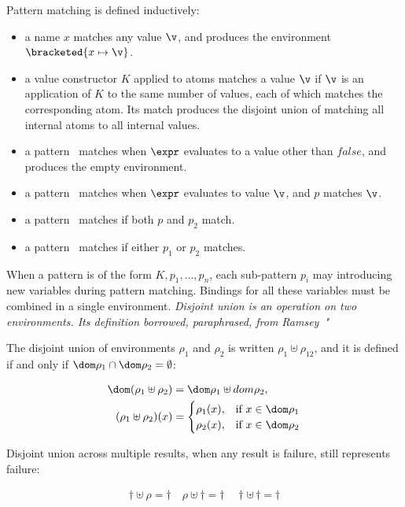 \documentclass[manuscript,screen,review, 12pt, nonacm]{acmart}
\begin{document}
Pattern matching is defined inductively: 
\begin{itemize}
    \item a name $x$ matches any value $\v$, and produces the environment 
    $\bracketed{x \mapsto \v}$. 
    \item a value constructor $K$ applied to atoms  matches 
    a value $\v$ if $\v$ is an application of $K$ to the same number of values,
    each of which matches the corresponding atom. Its match produces 
    the disjoint union of matching all internal atoms to all internal values. 
    \item a pattern \whenexpr\ matches when $\expr$ evaluates to a value other than 
    $\mathit{false}$, and produces the empty environment. 
    \item a pattern \parrowe\ matches when $\expr$ evaluates to 
          value $\v$, and $p$ matches $\v$. 
    \item a pattern \pcommap\ matches if both $p$ and $p_{2}$ match.
    \item a pattern \porp\ matches if either $p_{1}$ or $p_{2}$
    matches. 
\end{itemize}

When a pattern is of the form $K, p_{1}, \dots, p_{n}$, each sub-pattern $p_{i}$
may introducing new variables during pattern matching. Bindings for all these
variables must be combined in a single environment. \it{Disjoint union} is an
operation on two environments. Its definition borrowed, paraphrased, from Ramsey~\cite{bpc}" 

The disjoint union of environments $\rho_{1}$ and $\rho_{2}$ is written
$\rho_{1} \uplus \rho_{12}$, and it is defined if and only if $\dom \rho_{1}
\cap \dom \rho_{2} = \emptyset$:

\begin{align*}
  \dom(\rho_{1} \uplus \rho_{2}) &= \dom \rho_{1} \uplus dom \rho_{2}, \\
    (\rho_{1} \uplus \rho_{2})(x) &= 
  \begin{cases}
    \rho_{1}(x), & \text{if } x \in \dom  \rho_{1} \\
    \rho_{2}(x), & \text{if } x \in \dom \rho_{2} \\
\end{cases}
\end{align*}

Disjoint union across multiple results, when any result is failure, still
represents failure: 

\begin{gather*}
  \dagger \uplus \rho = \dagger \quad
  \rho \uplus \dagger = \dagger \quad
  \dagger \uplus\, \dagger = \dagger
\end{gather*}
\end{document}
